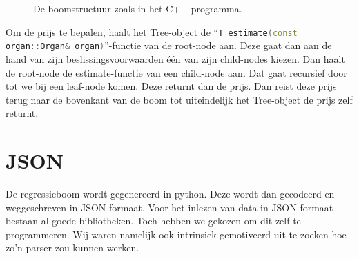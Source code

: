 \begin{figure}[ht]
    \centering
    \small

    \caption{De boomstructuur zoals in het C++-programma.}
    \label{fig:cpp-tree}
\end{figure}

Om de prijs te bepalen, haalt het Tree-object de ``\lstinline[language=C++]{T estimate(const organ::Organ& organ)}''-functie van de root-node aan. Deze gaat dan aan de hand van zijn beslissingsvoorwaarden één van zijn child-nodes kiezen. Dan haalt de root-node de estimate-functie van een child-node aan. Dat gaat recursief door tot we bij een leaf-node komen. Deze returnt dan de prijs. Dan reist deze prijs terug naar de bovenkant van de boom tot uiteindelijk het Tree-object de prijs zelf returnt.

\pagebreak
\section{JSON}
De regressieboom wordt gegenereerd in python. Deze wordt dan gecodeerd en weggeschreven in JSON-formaat. Voor het inlezen van data in JSON-formaat bestaan al goede bibliotheken. Toch hebben we gekozen om dit zelf te programmeren. Wij waren namelijk ook intrinsiek gemotiveerd uit te zoeken hoe zo'n parser zou kunnen werken.

